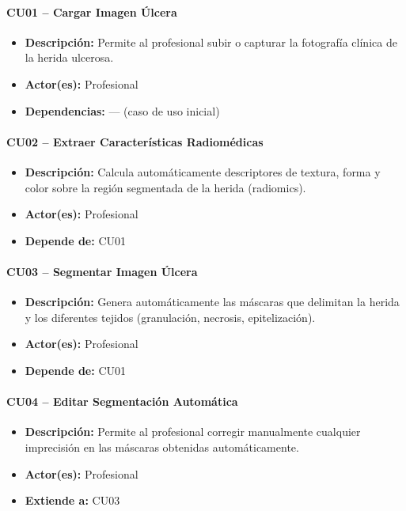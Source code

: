 \paragraph{CU01 -- Cargar Imagen Úlcera}
\begin{itemize}
  \item \textbf{Descripción:} Permite al profesional subir o capturar la fotografía clínica de la herida ulcerosa.
  \item \textbf{Actor(es):} Profesional
  \item \textbf{Dependencias:} — (caso de uso inicial)
\end{itemize}

\paragraph{CU02 -- Extraer Características Radiomédicas}
\begin{itemize}
  \item \textbf{Descripción:} Calcula automáticamente descriptores de textura, forma y color sobre la región segmentada de la herida (radiomics).
  \item \textbf{Actor(es):} Profesional
  \item \textbf{Depende de:} CU01
\end{itemize}

\paragraph{CU03 -- Segmentar Imagen Úlcera}
\begin{itemize}
  \item \textbf{Descripción:} Genera automáticamente las máscaras que delimitan la herida y los diferentes tejidos (granulación, necrosis, epitelización).
  \item \textbf{Actor(es):} Profesional
  \item \textbf{Depende de:} CU01
\end{itemize}

\paragraph{CU04 -- Editar Segmentación Automática}
\begin{itemize}
  \item \textbf{Descripción:} Permite al profesional corregir manualmente cualquier imprecisión en las máscaras obtenidas automáticamente.
  \item \textbf{Actor(es):} Profesional
  \item \textbf{Extiende a:} CU03
\end{itemize}

